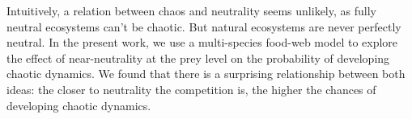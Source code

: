Intuitively, a relation between chaos and neutrality seems unlikely, as fully neutral ecosystems can't be chaotic. But natural ecosystems are never perfectly neutral. In the present work, we use a multi-species food-web model to explore the effect of near-neutrality at the prey level on the probability of developing chaotic dynamics. We found that there is a surprising relationship between both ideas: the closer to neutrality the competition is, the higher the chances of developing chaotic dynamics.
